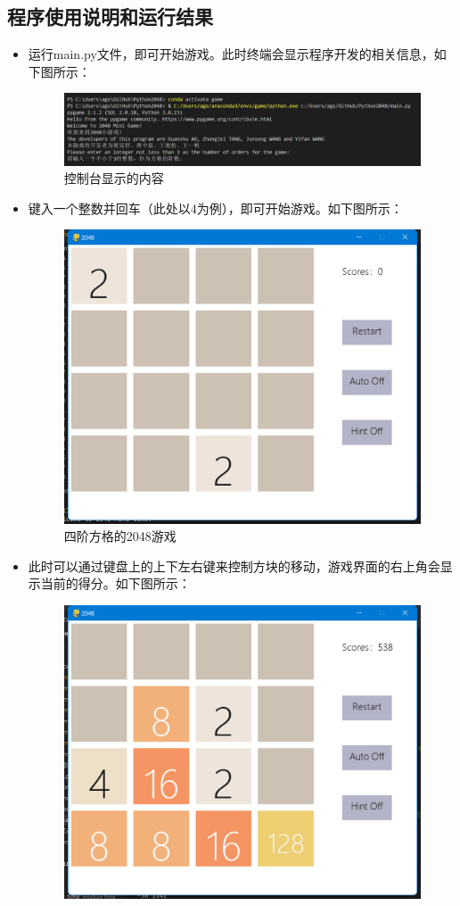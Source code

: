 \documentclass[UTF8,AutoFakeBold,AutoFakeSlant,zihao=-4]{ctexart}
\begin{document}
\subsection{程序使用说明和运行结果}
\begin{itemize}
  \item 运行main.py文件，即可开始游戏。此时终端会显示程序开发的相关信息，如下图所示：
    \begin{figure}[!ht]
      \centering
      \includegraphics[width=0.7\linewidth]{img/pic1.png}
      \caption{控制台显示的内容}
      \label{fig:mergesort}
    \end{figure}
  \item 键入一个整数并回车（此处以4为例），即可开始游戏。如下图所示：
    \begin{figure}[!ht]
      \centering
      \includegraphics[width=0.7\linewidth]{img/pic2.png}
      \caption{四阶方格的2048游戏}
      \label{fig:mergesort}
    \end{figure}
  \item 此时可以通过键盘上的上下左右键来控制方块的移动，游戏界面的右上角会显示当前的得分。如下图所示：
    \begin{figure}[!ht]
      \centering
      \includegraphics[width=0.7\linewidth]{img/pic3.png}

\end{figure}
\end{itemize}
\end{document}
